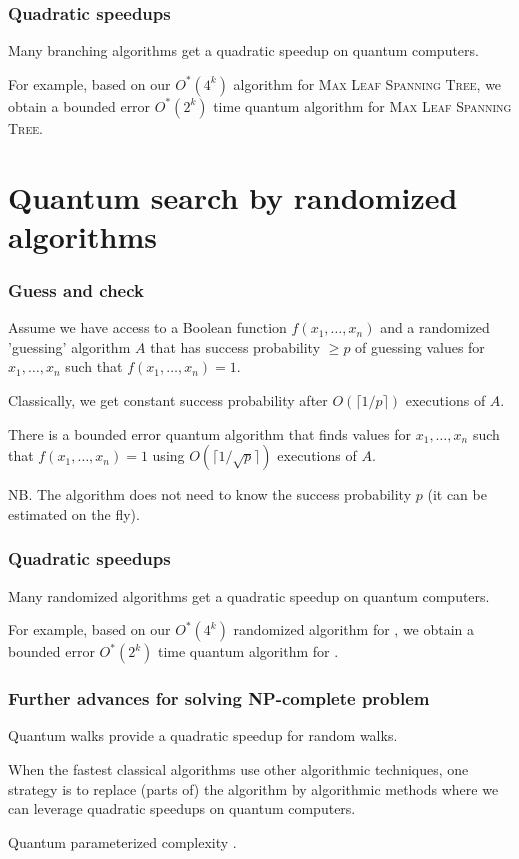 	\begin{frame}
		\frametitle{Quadratic speedups}
		
		Many branching algorithms get a quadratic speedup on quantum computers.
		
		\medskip
		For example, based on our $O^*(4^k)$ algorithm for \textsc{Max Leaf Spanning Tree}, we obtain a bounded error $O^*(2^k)$ time quantum algorithm for \textsc{Max Leaf Spanning Tree}.
	\end{frame}
	
	\section{Quantum search by randomized algorithms}
	
	\begin{frame}
		\frametitle{Guess and check}
		
		Assume we have access to a Boolean function $f(x_1,\dots,x_n)$ and a randomized 'guessing' algorithm $A$ that has success probability $\ge p$ of guessing values for $x_1,\dots,x_n$ such that $f(x_1,\dots,x_n)=1$.
		
		Classically, we get constant success probability after  $O(\lceil 1/p \rceil)$ executions of $A$.
		
		\begin{theorem}
			There is a bounded error quantum algorithm that finds values for $x_1, \dots, x_n$ such that $f(x_1,\dots,x_n)=1$ using $O(\lceil 1/\sqrt{p} \rceil)$ executions of $A$.
		\end{theorem}
		
		NB. The algorithm does not need to know the success probability $p$ (it can be estimated on the fly).
	\end{frame}
	
	\begin{frame}
		\frametitle{Quadratic speedups}
		
		Many randomized algorithms get a quadratic speedup on quantum computers.
		
		\medskip
		For example, based on our $O^*(4^k)$ randomized algorithm for \FVS, we obtain a bounded error $O^*(2^k)$ time quantum algorithm for \FVS.
	\end{frame}
	
	\begin{frame}
		\frametitle{Further advances for solving NP-complete problem}
		
		Quantum walks provide a quadratic speedup for random walks.
		
		\medskip
		When the fastest classical algorithms use other algorithmic techniques, one strategy is to replace (parts of) the algorithm by algorithmic methods where we can leverage quadratic speedups on quantum computers.
		
		\medskip
		Quantum parameterized complexity \cite{BremnerJMMMS22}.
	\end{frame}
	
	
	\begin{frame}[t, allowframebreaks]
		\slides{\frametitle{References}}
		\printbibliography
	\end{frame}

